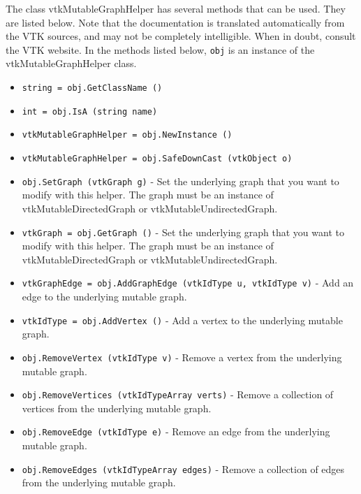 The class vtkMutableGraphHelper has several methods that can be used.
  They are listed below.
Note that the documentation is translated automatically from the VTK sources,
and may not be completely intelligible.  When in doubt, consult the VTK website.
In the methods listed below, \verb|obj| is an instance of the vtkMutableGraphHelper class.
\begin{itemize}
\item  \verb|string = obj.GetClassName ()|

\item  \verb|int = obj.IsA (string name)|

\item  \verb|vtkMutableGraphHelper = obj.NewInstance ()|

\item  \verb|vtkMutableGraphHelper = obj.SafeDownCast (vtkObject o)|

\item  \verb|obj.SetGraph (vtkGraph g)| -  Set the underlying graph that you want to modify with this helper.
 The graph must be an instance of vtkMutableDirectedGraph or
 vtkMutableUndirectedGraph.

\item  \verb|vtkGraph = obj.GetGraph ()| -  Set the underlying graph that you want to modify with this helper.
 The graph must be an instance of vtkMutableDirectedGraph or
 vtkMutableUndirectedGraph.

\item  \verb|vtkGraphEdge = obj.AddGraphEdge (vtkIdType u, vtkIdType v)| -  Add an edge to the underlying mutable graph.

\item  \verb|vtkIdType = obj.AddVertex ()| -  Add a vertex to the underlying mutable graph.

\item  \verb|obj.RemoveVertex (vtkIdType v)| -  Remove a vertex from the underlying mutable graph.

\item  \verb|obj.RemoveVertices (vtkIdTypeArray verts)| -  Remove a collection of vertices from the underlying mutable graph.

\item  \verb|obj.RemoveEdge (vtkIdType e)| -  Remove an edge from the underlying mutable graph.

\item  \verb|obj.RemoveEdges (vtkIdTypeArray edges)| -  Remove a collection of edges from the underlying mutable graph.

\end{itemize}
